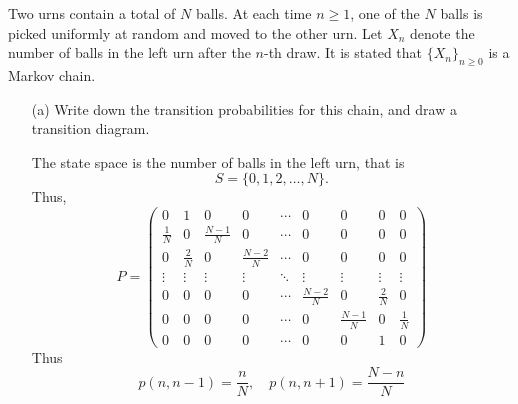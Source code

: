 \documentclass[11pt]{article}
\begin{document}
Two urns contain a total of \( N \) balls. At each time \( n \geq 1 \), one of the \( N \) balls is picked uniformly at random and moved to the other urn. Let \( X_n \) denote the number of balls in the left urn after the \( n \)-th draw. It is stated that \( \{X_n\}_{n \geq 0} \) is a Markov chain.

\begin{enumerate}
    \item[(a)] Write down the transition probabilities for this chain, and draw a transition diagram.
\begin{solution}
The state space is the number of balls in the left urn, that is 
\[S = \{0, 1, 2, \dots, N\}.\] Thus,
\[P = \begin{pmatrix}
    0 & 1 & 0  & 0 & \cdots & 0 & 0&0 & 0\\
    \frac{1}{N} & 0 & \frac{N-1}{N} & 0 & \cdots & 0 & 0&0 & 0\\
    0 & \frac{2}{N} & 0 & \frac{N-2}{N} & \cdots & 0 & 0&0 & 0\\
    \vdots&\vdots &\vdots & \vdots &\ddots & \vdots & \vdots & \vdots & \vdots\\
    0 & 0 &  0 & 0 & \cdots & \frac{N-2}{N} &  0 & \frac{2}{N} & 0 \\
    0 & 0 &  0 & 0 & \cdots & 0 &  \frac{N-1}{N} & 0 & \frac{1}{N} \\
    0 & 0 &  0 & 0 & \cdots & 0 &0 & 1 & 0
\end{pmatrix}\]
Thus 
\[p(n, n-1) = \frac{n}{N}, \quad p(n, n+1) = \frac{N-n}{N}\]
\begin{center}
\end{center}




\end{solution}
\end{enumerate}
\end{document}
